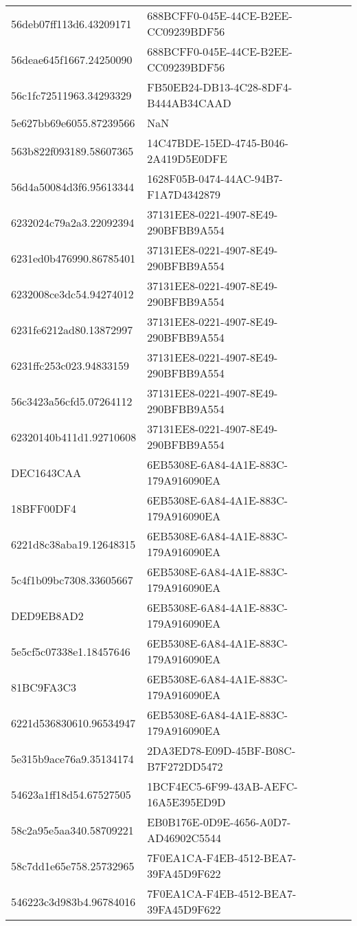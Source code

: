 \begin{tabular}{ll}
56deb07ff113d6.43209171 & 688BCFF0-045E-44CE-B2EE-CC09239BDF56 \\
56deae645f1667.24250090 & 688BCFF0-045E-44CE-B2EE-CC09239BDF56 \\
56c1fc72511963.34293329 & FB50EB24-DB13-4C28-8DF4-B444AB34CAAD \\
5e627bb69e6055.87239566 & NaN \\
563b822f093189.58607365 & 14C47BDE-15ED-4745-B046-2A419D5E0DFE \\
56d4a50084d3f6.95613344 & 1628F05B-0474-44AC-94B7-F1A7D4342879 \\
6232024c79a2a3.22092394 & 37131EE8-0221-4907-8E49-290BFBB9A554 \\
6231ed0b476990.86785401 & 37131EE8-0221-4907-8E49-290BFBB9A554 \\
6232008ce3dc54.94274012 & 37131EE8-0221-4907-8E49-290BFBB9A554 \\
6231fe6212ad80.13872997 & 37131EE8-0221-4907-8E49-290BFBB9A554 \\
6231ffc253c023.94833159 & 37131EE8-0221-4907-8E49-290BFBB9A554 \\
56c3423a56cfd5.07264112 & 37131EE8-0221-4907-8E49-290BFBB9A554 \\
62320140b411d1.92710608 & 37131EE8-0221-4907-8E49-290BFBB9A554 \\
DEC1643CAA & 6EB5308E-6A84-4A1E-883C-179A916090EA \\
18BFF00DF4 & 6EB5308E-6A84-4A1E-883C-179A916090EA \\
6221d8c38aba19.12648315 & 6EB5308E-6A84-4A1E-883C-179A916090EA \\
5c4f1b09bc7308.33605667 & 6EB5308E-6A84-4A1E-883C-179A916090EA \\
DED9EB8AD2 & 6EB5308E-6A84-4A1E-883C-179A916090EA \\
5e5cf5c07338e1.18457646 & 6EB5308E-6A84-4A1E-883C-179A916090EA \\
81BC9FA3C3 & 6EB5308E-6A84-4A1E-883C-179A916090EA \\
6221d536830610.96534947 & 6EB5308E-6A84-4A1E-883C-179A916090EA \\
5e315b9ace76a9.35134174 & 2DA3ED78-E09D-45BF-B08C-B7F272DD5472 \\
54623a1ff18d54.67527505 & 1BCF4EC5-6F99-43AB-AEFC-16A5E395ED9D \\
58c2a95e5aa340.58709221 & EB0B176E-0D9E-4656-A0D7-AD46902C5544 \\
58c7dd1e65e758.25732965 & 7F0EA1CA-F4EB-4512-BEA7-39FA45D9F622 \\
546223c3d983b4.96784016 & 7F0EA1CA-F4EB-4512-BEA7-39FA45D9F622 \\

\end{tabular}
